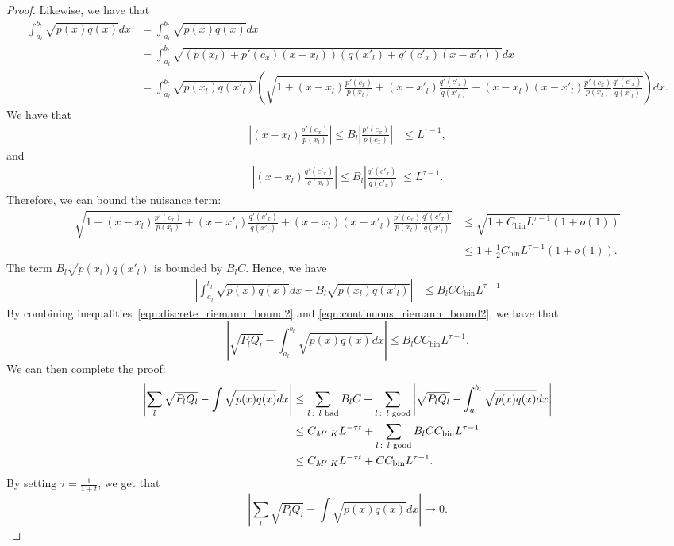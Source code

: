 \documentclass{article}
\newcommand{\bin}{\text{bin}}
\begin{document}
\begin{proof}
Likewise, we have that 
\begin{align*}
\int_{a_l}^{b_l} \sqrt{p(x) q(x)}dx &= \int_{a_l}^{b_l} \sqrt{p(x) q(x)} dx \\
                      &= \int_{a_l}^{b_l} \sqrt{ (p(x_l) + p'(c_x)(x - x_l))
                                      (q(x'_l) + q'(c'_x)(x - x'_l)) } dx \\
    &=\int_{a_l}^{b_l} \sqrt{ p(x_l) q(x'_l)} \left(
              \sqrt{ 1+ (x - x_l) \frac{p'(c_x)}{p(x_l)} + (x - x'_l) \frac{q'(c'_x)}{q(x'_l)} 
                     + (x - x_l)(x - x'_l) \frac{p'(c_x)}{p(x_l)} \frac{q'(c'_x)}{q(x'_l)} } \right) dx. 
\end{align*}
We have that 
\begin{align*}
\left| (x - x_l) \frac{p'(c_x)}{p(x_l)} \right| \leq B_l \left| \frac{ p'(c_x)}{p(c_x)} \right| &\leq L^{\tau - 1}, 
\end{align*}
and
\begin{align*}
\left| (x - x_l) \frac{q'(c'_x)}{q(x_l)} \right| \leq B_l \left| \frac{ q'(c'_x)}{q(c'_x)} \right| \leq L^{\tau - 1} .
\end{align*}
Therefore, we can bound the nuisance term:
\begin{align*}
 \sqrt{ 1+ (x - x_l) \frac{p'(c_x)}{p(x_l)} + (x - x'_l) \frac{q'(c'_x)}{q(x'_l)} 
                     + (x - x_l)(x - x'_l) \frac{p'(c_x)}{p(x_l)} \frac{q'(c'_x)}{q(x'_l)} } 
    &\leq \sqrt{ 1 + C_\bin L^{\tau - 1} (1 + o(1)) } \\
    &\leq 1 + \frac{1}{2} C_\bin L^{\tau - 1} (1 + o(1)). 
\end{align*}
The term $B_l \sqrt{p(x_l)q(x'_l)}$ is bounded by $B_l C$. Hence, we have
\begin{align}
\label{eqn:continuous_riemann_bound2}
\left| \int_{a_l}^{b_l} \sqrt{p(x) q(x)}dx - B_l \sqrt{p(x_l) q(x'_l)} \right| &\leq B_l C C_\bin L^{\tau - 1}
\end{align}
By combining inequalities~\eqref{eqn:discrete_riemann_bound2} and \eqref{eqn:continuous_riemann_bound2}, we have that
\[
\left| \sqrt{P_l Q_l} - \int_{a_l}^{b_l} \sqrt{p(x) q(x)} dx \right| \leq B_l C C_\bin L^{\tau - 1}.
\]
We can then complete the proof:
\begin{align*}
\left| \sum_l \sqrt{P_l Q_l} - \int \sqrt{p(x) q(x)} dx \right| &\leq
   \sum_{l \,:\, \trm{ $l$ bad}} B_l C + 
   \sum_{l \,:\, \trm{ $l$ good}} \left| \sqrt{P_l Q_l} - \int_{a_l}^{b_l} \sqrt{ p(x) q(x)} dx \right| \\
  & \leq C_{M',K} L^{ - \tau t} + \sum_{l \,:\, \trm{ $l$ good}} B_l C C_\bin L^{\tau - 1} \\
  & \leq  C_{M',K} L^{ - \tau t} + C C_\bin L^{\tau - 1}.
\end{align*}
By setting $\tau = \frac{1}{1+t}$, we get that
\[
\left| \sum_l \sqrt{P_l Q_l} - \int \sqrt{p(x) q(x)} dx \right| \rightarrow 0. 
\]
\end{proof}
\end{document}
